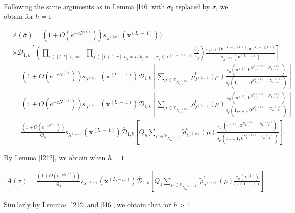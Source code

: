 \documentclass[11pt]{amsart}
\theoremstyle{plain}
\theoremstyle{definition}
\theoremstyle{remark}
\newcommand\ol{\overline}
\newcommand\si{\sigma}
\newcommand\YY{\mathbb{Y}}
\numberwithin{equation}{section}
\numberwithin{theorem}{section}
\numberwithin{figure}{section}
\begin{document}
Following the same arguments as in Lemma \ref{l46} with $\si_0$ replaced by $\si$, we obtain for $h=1$
\begin{small}
\begin{align*}
&A(\ol{\si})=(1+O(e^{-cN^{(\epsilon)}}))
s_{\lambda^{(1,\sigma)}}(\mathbf{x}^{(L,-,1)}))
\\
&\times\mathcal{D}_{1,k} \left[\left(\prod_{i\in[l..t],b_i=+}
\prod_{j\in[t+1..r],a_j=L,b_j=-,x_j\in \mathbf{x}^{(L,-,>t,1)}}\frac{\xi_{ij}}{z_{ij}}\right)\frac{s_{\lambda^{(1,\sigma)}}(\mathbf{u}^{(L,-,>t,1)},\mathbf{x}^{(L,-,\leq t,1)}}{s_{\lambda^{(1,\sigma)}}(\mathbf{x}^{(L,-,1)})}
\right]\\
&=(1+O(e^{-cN^{(\epsilon)}}))
s_{\lambda^{(1,\sigma)}}(\mathbf{x}^{(L,-,1)})
\mathcal{D}_{1,k}\left[\sum_{\mu\in \YY_{N_{L,-}^{(>t,\epsilon)}}}\tilde{\rho}^t_{\lambda^{(1,\si)}}(\mu)
\frac{s_{\mu}(\underline{u}^{(1)},0^{N_{L,-}^{(>t,\epsilon)}-N_{L,-,1}^{(>t,\epsilon)}})}{s_{\mu}(1,\ldots,1,0^{N_{L,-}^{(>t,\epsilon)}-N_{L,-,1}^{(>t,\epsilon)}})}\right]\\
&=(1+O(e^{-cN^{(\epsilon)}}))
s_{\lambda^{(1,\sigma)}}(\mathbf{x}^{(L,-,1)})
\mathcal{D}_{1,k}\left[\sum_{\mu\in \YY_{N_{L,-}^{(>t,\epsilon)}}}\tilde{\rho}^t_{\lambda^{(1,\si)}}(\mu)
\frac{s_{\mu}(\underline{u}^{(1)},0^{N_{L,-}^{(>t,\epsilon)}-N_{L,-,1}^{(>t,\epsilon)}})}{s_{\mu}(1,\ldots,1,0^{N_{L,-}^{(>t,\epsilon)}-N_{L,-,1}^{(>t,\epsilon)}})}\right]\\
&=\frac{(1+O(e^{-cN^{(\epsilon)}}))}{Q_h}
s_{\lambda^{(1,\sigma)}}(\mathbf{x}^{(L,-,1)})
\ol{\mathcal{D}}_{1,k}\left[Q_h\sum_{\mu\in \YY_{N_{L,-}^{(>t,\epsilon)}}}\tilde{\rho}^t_{\lambda^{(1,\si)}}(\mu)
\frac{s_{\mu}(\underline{u}^{(1)},0^{N_{L,-}^{(>t,\epsilon)}-N_{L,-,1}^{(>t,\epsilon)}})}{s_{\mu}(1,\ldots,1,0^{N_{L,-}^{(>t,\epsilon)}-N_{L,-,1}^{(>t,\epsilon)}})}\right].
\end{align*}
\end{small}
By Lemma \ref{l212}, we obtain when $h=1$
\begin{small}
\begin{align*}
A(\ol{\si})=\frac{(1+O(e^{-cN^{(\epsilon)}}))}{Q_1}
s_{\lambda^{(1,\sigma)}}(\mathbf{x}^{(L,-,1)})
\ol{\mathcal{D}}_{1,k}\left[Q_1\sum_{\mu\in \YY_{N_{L,-}^{(>t,\epsilon,1)}}}\tilde{\rho}^t_{\lambda^{(1,\si)}}(\mu)
\frac{s_{\mu}(\underline{u}^{(1)})}{s_{\mu}(1,\ldots,1)}\right].
\end{align*}
\end{small}
Similarly by Lemmas \ref{l212} and \ref{l46}, we obtain that for $h>1$
\end{document}
